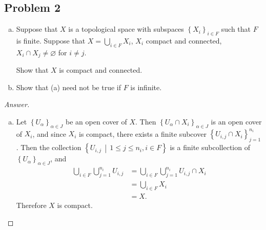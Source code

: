 \documentclass[12pt]{article}
\newcommand\setb[1]{\left \{ #1 \right \}}
\theoremstyle{definition}
\begin{document}
\subsection{Problem 2}
\begin{enumerate}[(a)]
    \item Suppose that $X$ is a topological space with subspaces $\setb{ X_i }_{i \in F}$ such that $F$ is finite. Suppose that $X = \bigcup\limits_{i \in F} X_i$, $X_i$ compact and connected, $X_i \cap X_j \neq \varnothing$ for $i \neq j$.
    
    Show that $X$ is compact and connected.
    \item Show that (a) need not be true if $F$ is infinite.
\end{enumerate}
\begin{proof}[Answer]
    \noindent
    \begin{enumerate}[(a)]
        \item Let $\setb{ U_{\alpha} }_{\alpha \in J}$ be an open cover of $X$. Then $\setb{ U_{\alpha} \cap X_i }_{\alpha \in J}$ is an open cover of $X_i$, and since $X_i$ is compact, there exists a finite subcover $\setb{ U_{i,j} \cap X_i }_{j = 1}^{n_i}$. Then the collection $\setb{ U_{i,j} \, \middle| \, 1 \leq j \leq n_i , i \in F }$ is a finite subcollection of $\setb{ U_{\alpha} }_{\alpha \in J}$, and 
        \begin{align*}
            \bigcup\limits_{i \in F} \bigcup\limits_{j = 1}^{n_i} U_{i,j} & = \bigcup\limits_{i \in F} \bigcup\limits_{j = 1}^{n_i} U_{i,j} \cap X_i \\
            & = \bigcup\limits_{i \in F} X_i \\
            & = X.
        \end{align*}
        Therefore $X$ is compact. 
        

\end{enumerate}
\end{proof}
\end{document}
